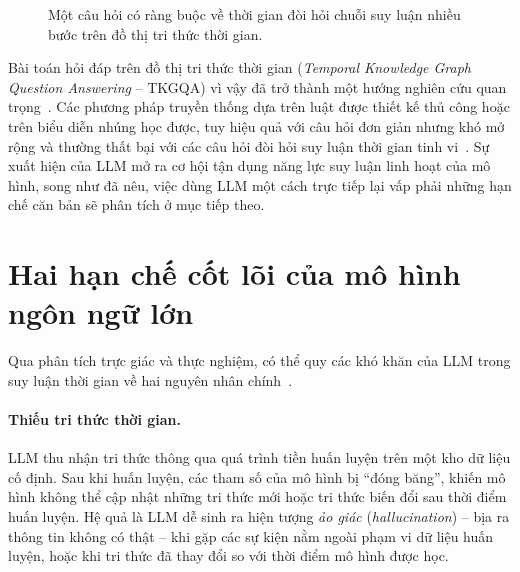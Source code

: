 \begin{figure}[ht]
  \centering
  \caption{Một câu hỏi có ràng buộc về thời gian đòi hỏi chuỗi suy luận nhiều bước trên đồ thị
  tri thức thời gian. }
  \label{fig:temporal-example}
\end{figure}

Bài toán hỏi đáp trên đồ thị tri thức thời gian (\textit{Temporal Knowledge Graph Question
Answering} -- TKGQA) vì vậy đã trở thành một hướng nghiên cứu quan trọng~\cite{saxena2021cronkgqa,
chen2023multitq}. Các phương pháp truyền thống dựa trên luật được thiết kế thủ công hoặc trên
biểu diễn nhúng học được, tuy hiệu quả với câu hỏi đơn giản nhưng khó mở rộng và thường thất bại
với các câu hỏi đòi hỏi suy luận thời gian tinh vi~\cite{chen2022subgraph}. Sự xuất hiện của LLM
mở ra cơ hội tận dụng năng lực suy luận linh hoạt của mô hình, song như đã nêu, việc dùng LLM một
cách trực tiếp lại vấp phải những hạn chế căn bản sẽ phân tích ở mục tiếp theo.

\section{Hai hạn chế cốt lõi của mô hình ngôn ngữ lớn}
\label{sec:limitations}

Qua phân tích trực giác và thực nghiệm, có thể quy các khó khăn của LLM trong suy luận thời gian
về hai nguyên nhân chính~\cite{chen2024ari}.

\paragraph{Thiếu tri thức thời gian.} LLM thu nhận tri thức thông qua quá trình tiền huấn luyện
trên một kho dữ liệu cố định. Sau khi huấn luyện, các tham số của mô hình bị ``đóng băng'', khiến
mô hình không thể cập nhật những tri thức mới hoặc tri thức biến đổi sau thời điểm huấn luyện. Hệ
quả là LLM dễ sinh ra hiện tượng \textit{ảo giác} (\textit{hallucination}) -- bịa ra thông tin
không có thật -- khi gặp các sự kiện nằm ngoài phạm vi dữ liệu huấn luyện, hoặc khi tri thức đã
thay đổi so với thời điểm mô hình được học.

